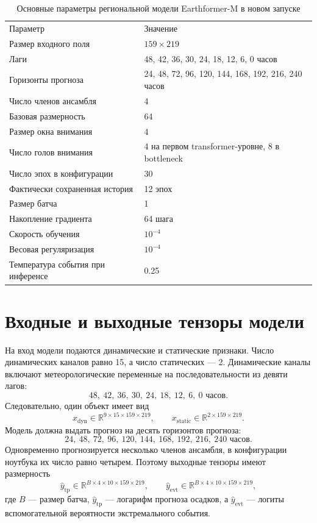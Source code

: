 \begin{table}[H]
\centering
\begin{tabular}{p{}p{}}
Параметр & Значение \\
Размер входного поля & \(159\times219\) \\
Лаги & 48, 42, 36, 30, 24, 18, 12, 6, 0 часов \\
Горизонты прогноза & 24, 48, 72, 96, 120, 144, 168, 192, 216, 240 часов \\
Число членов ансамбля & 4 \\
Базовая размерность & 64 \\
Размер окна внимания & 4 \\
Число голов внимания & 4 на первом transformer-уровне, 8 в bottleneck \\
Число эпох в конфигурации & 30 \\
Фактически сохраненная история & 12 эпох \\
Размер батча & 1 \\
Накопление градиента & 64 шага \\
Скорость обучения & \(10^{-4}\) \\
Весовая регуляризация & \(10^{-4}\) \\
Температура события при инференсе & 0.25 \\
\end{tabular}
\caption{Основные параметры региональной модели Earthformer-M в новом запуске}
\label{tab:cfg-regional-main}
\end{table}

\section{Входные и выходные тензоры модели}

На вход модели подаются динамические и статические признаки. Число динамических каналов равно 15, а число статических — 2. Динамические каналы включают метеорологические переменные на последовательности из девяти лагов:
\[
48,\ 42,\ 36,\ 30,\ 24,\ 18,\ 12,\ 6,\ 0 \text{ часов}.
\]
Следовательно, один объект имеет вид
\[
x_{\text{dyn}} \in \mathbb{R}^{9 \times 15 \times 159 \times 219}, \qquad
x_{\text{static}} \in \mathbb{R}^{2 \times 159 \times 219}.
\]
Модель должна выдать прогноз на десять горизонтов прогноза:
\[
24,\ 48,\ 72,\ 96,\ 120,\ 144,\ 168,\ 192,\ 216,\ 240 \text{ часов}.
\]
Одновременно прогнозируется несколько членов ансамбля, в конфигурации ноутбука их число равно четырем. Поэтому выходные тензоры имеют размерность
\[
\hat y_{\text{tp}} \in \mathbb{R}^{B \times 4 \times 10 \times 159 \times 219}, \qquad
\hat y_{\text{evt}} \in \mathbb{R}^{B \times 4 \times 10 \times 159 \times 219},
\]
где \(B\) — размер батча, \(\hat y_{\text{tp}}\) — логарифм прогноза осадков, а \(\hat y_{\text{evt}}\) — логиты вспомогательной вероятности экстремального события.

